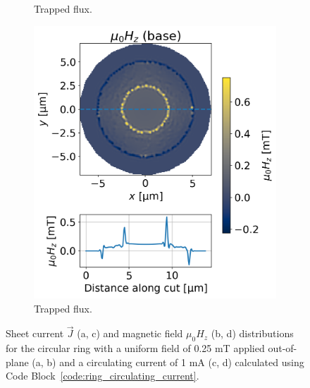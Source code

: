 \documentclass[final,3p,times]{elsarticle}
\begin{document}
\begin{figure}[!h]
\begin{subfigure}{.235\textwidth}
  \caption{Trapped flux.}
  \label{fig:square_ring_plot_currents}
\end{subfigure}
\begin{subfigure}{.235\textwidth}
  \centering
  \includegraphics[width=\linewidth]{examples/images/ring/circular_ring_circ_plot_fields.png}
  \caption{Trapped flux.}
  \label{fig:square_ring_plot_fields}
\end{subfigure}

\caption{Sheet current $\vec{J}$ (a, c) and magnetic field $\mu_0H_z$ (b, d) distributions for the circular ring with a uniform field of 0.25 mT applied out-of-plane (a, b) and a circulating current of 1 mA (c, d) calculated using Code Block~\ref{code:ring_circulating_current}.}
\label{fig:ring_plot_fields_currents}
\end{figure}
\end{document}
